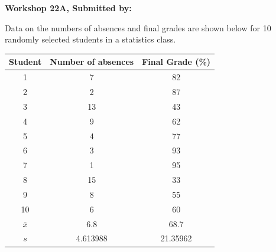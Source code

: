 \documentclass[11pt, chapterprefix=true]{scrbook}\usepackage[]{graphicx}\usepackage[]{color}
\begin{document}
\begin{exercises}
\clearpage

    \begin{exercise}  %

    \begin{center}
\begin{flushleft}\textbf{\large \hfill Workshop 22A, Submitted by: }\end{flushleft}

\end{center}

Data on the numbers of absences and final grades are shown below for 10 randomly selected students in a statistics class.
\begin{center}
\begin{tabular}{@{} ccc @{}} \hline
Student &	Number of absences &	Final Grade (\%) \\ \hline
1&	7&	82 \\
2&	2&	87 \\
3&	13&	43 \\
4&	9&	62 \\
5&	4&	77 \\
6&	3&	93 \\
7&	1&	95 \\
8&	15&	33 \\
9&	8&	55 \\
10&	6&	60 \\ \hline
$\bar{x}$ & 6.8 & 68.7 \\
$s$ & 4.613988 & 21.35962 \\ \hline
\end{tabular}
\end{center}


\end{exercise}
\end{exercises}
\end{document}
